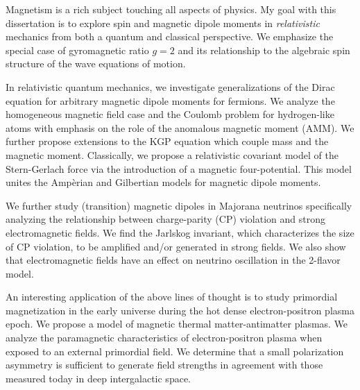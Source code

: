 

Magnetism is a rich subject touching all aspects of physics. My goal with this dissertation is to explore spin and magnetic dipole moments in \emph{relativistic} mechanics from both a quantum and classical perspective. We emphasize the special case of gyromagnetic ratio $g\!=\!2$ and its relationship to the algebraic spin structure of the wave equations of motion.

In relativistic quantum mechanics, we investigate generalizations of the Dirac equation for arbitrary magnetic dipole moments for fermions. We analyze the homogeneous magnetic field case and the Coulomb problem for hydrogen-like atoms with emphasis on the role of the anomalous magnetic moment (AMM). We further propose extensions to the KGP equation which couple mass and the magnetic moment. Classically, we propose a relativistic covariant model of the Stern-Gerlach force via the introduction of a magnetic four-potential. This model unites the Amp{\`e}rian and Gilbertian models for magnetic dipole moments.

We further study (transition) magnetic dipoles in Majorana neutrinos specifically analyzing the relationship between charge-parity (CP) violation and strong electromagnetic fields. We find the Jarlskog invariant, which characterizes the size of CP violation, to be amplified and/or generated in strong fields. We also show that electromagnetic fields have an effect on neutrino oscillation in the 2-flavor model.

An interesting application of the above lines of thought is to study primordial magnetization in the early universe during the hot dense electron-positron plasma epoch. We propose a model of magnetic thermal matter-antimatter plasmas. We analyze the paramagnetic characteristics of electron-positron plasma when exposed to an external primordial field. We determine that a small polarization asymmetry is sufficient to generate field strengths in agreement with those measured today in deep intergalactic space.
